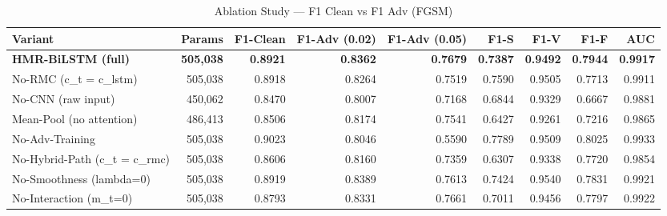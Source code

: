 \begin{table}[h]
\centering
\caption{Ablation Study --- F1 Clean vs F1 Adv (FGSM)}
\label{tab:ablation_final}
\begin{tabular}{lrrrrrrrr}
\toprule
Variant & Params & F1-Clean & F1-Adv (0.02) & F1-Adv (0.05) & F1-S & F1-V & F1-F & AUC \\
\midrule
\textbf{HMR-BiLSTM (full)} & \textbf{505,038} & \textbf{0.8921} & \textbf{0.8362} & \textbf{0.7679} & \textbf{0.7387} & \textbf{0.9492} & \textbf{0.7944} & \textbf{0.9917} \\
No-RMC (c_t = c_lstm) & 505,038 & 0.8918 & 0.8264 & 0.7519 & 0.7590 & 0.9505 & 0.7713 & 0.9911 \\
No-CNN (raw input) & 450,062 & 0.8470 & 0.8007 & 0.7168 & 0.6844 & 0.9329 & 0.6667 & 0.9881 \\
Mean-Pool (no attention) & 486,413 & 0.8506 & 0.8174 & 0.7541 & 0.6427 & 0.9261 & 0.7216 & 0.9865 \\
No-Adv-Training & 505,038 & 0.9023 & 0.8046 & 0.5590 & 0.7789 & 0.9509 & 0.8025 & 0.9933 \\
No-Hybrid-Path (c_t = c_rmc) & 505,038 & 0.8606 & 0.8160 & 0.7359 & 0.6307 & 0.9338 & 0.7720 & 0.9854 \\
No-Smoothness (lambda=0) & 505,038 & 0.8919 & 0.8389 & 0.7613 & 0.7424 & 0.9540 & 0.7831 & 0.9921 \\
No-Interaction (m_t=0) & 505,038 & 0.8793 & 0.8331 & 0.7661 & 0.7011 & 0.9456 & 0.7797 & 0.9922 \\
\bottomrule
\end{tabular}
\end{table}
